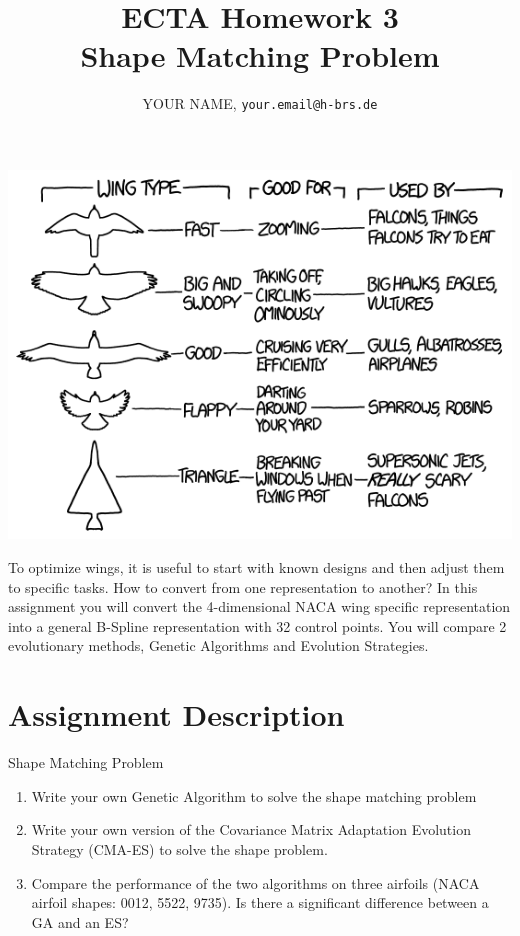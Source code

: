 \documentclass{article}
\title{ECTA Homework 3\\Shape Matching Problem}
\author{\color{red}YOUR NAME, \texttt{your.email@h-brs.de}}
\begin{document}
\maketitle
\begin{center}
	\begin{minipage}{1\linewidth}
		\centering
			\includegraphics[scale=0.6]{img/wingtypes.png}
	\end{minipage}
\end{center}

To optimize wings, it is useful to start with known designs and then adjust them to specific tasks. How to convert from one representation to another? In this assignment you will convert the 4-dimensional NACA wing specific representation into a general B-Spline representation with 32 control points. You will compare 2 evolutionary methods, Genetic Algorithms and Evolution Strategies.

\newpage

\section{Assignment Description}
	Shape Matching Problem
	\begin{enumerate}
		\item Write your own Genetic Algorithm to solve the shape matching problem
		\item Write your own version of the Covariance Matrix Adaptation Evolution Strategy (CMA-ES) to solve the shape problem.
		\item Compare the performance of the two algorithms on three airfoils (NACA airfoil shapes: 0012, 5522, 9735). Is there a significant difference between a GA and an ES? 
	\end{enumerate}
\end{document}
